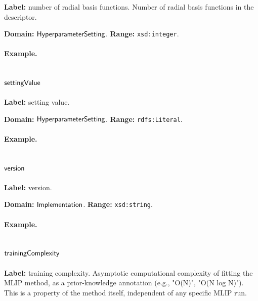 \textbf{Label:} number of radial basis functions.
Number of radial basis functions in the descriptor.

\textbf{Domain:} $\mathsf{HyperparameterSetting}$.
\textbf{Range:} \texttt{xsd:integer}.

\paragraph{Example.}

\subsection{$\mathsf{settingValue}$}
\label{sec:term-settingValue}

\textbf{Label:} setting value.

\textbf{Domain:} $\mathsf{HyperparameterSetting}$.
\textbf{Range:} \texttt{rdfs:Literal}.

\paragraph{Example.}

\subsection{$\mathsf{version}$}
\label{sec:term-version}

\textbf{Label:} version.

\textbf{Domain:} $\mathsf{Implementation}$.
\textbf{Range:} \texttt{xsd:string}.

\paragraph{Example.}

\subsection{$\mathsf{trainingComplexity}$}
\label{sec:term-trainingComplexity}

\textbf{Label:} training complexity.
Asymptotic computational complexity of fitting the MLIP method, as a prior-knowledge annotation (e.g., "O(N)", "O(N log N)"). This is a property of the method itself, independent of any specific MLIP run.

